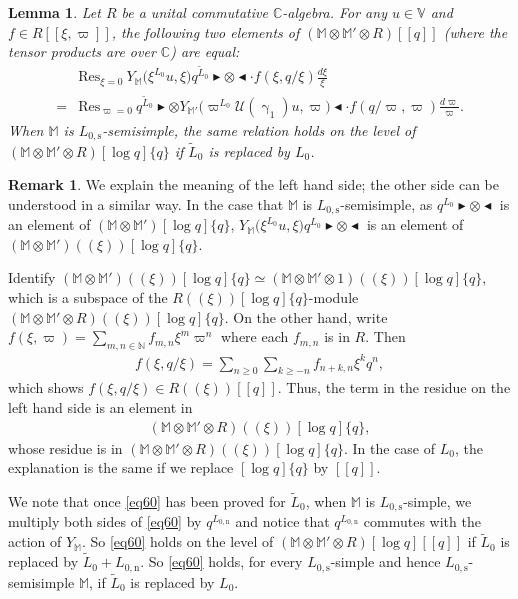 \documentclass[12pt,a4paper,notitlepage]{article}
\theoremstyle{definition}
\newtheorem{rem}[df]{Remark}
\theoremstyle{plain}
\newtheorem{lm}[df]{Lemma}
\newcommand{\mc}{\mathcal}
\newcommand{\wtd}{\widetilde}
\newcommand{\Res}{\mathrm{Res}}
\newcommand{\Vbb}{\mathbb V}
\newcommand{\Mbb}{\mathbb M}
\newcommand{\Cbb}{\mathbb C}
\newcommand{\Nbb}{\mathbb N}
\newcommand{\btl}{\blacktriangleleft}
\newcommand{\btr}{\blacktriangleright}
\newcommand{\Lss}{{L_{0,\mathrm{s}}}}
\newcommand{\Lni}{{L_{0,\mathrm{n}}}}
\numberwithin{equation}{section}
\begin{document}
\begin{lm}\label{lb32}
	Let $R$ be a unital commutative $\Cbb$-algebra.  For any $u\in\Vbb$ and $f\in R[[\xi,\varpi]]$, the following two elements of $(\Mbb\otimes\Mbb'\otimes R)[[q]]$ (where the tensor products are over $\Cbb$) are equal:
	\begin{align}
	&\Res_{\xi=0}~Y_{\Mbb}\big(\xi^{L_0}u,\xi\big)q^{\wtd L_0}\btr\otimes\btl\cdot f(\xi,q/\xi)\frac{d\xi}{\xi}\nonumber\\
	=&\Res_{\varpi=0}~q^{\wtd L_0}\btr\otimes Y_{\Mbb'}\big(\varpi^{L_0}\mc U(\upgamma_1)u,\varpi\big)\btl\cdot f(q/\varpi,\varpi)\frac{d\varpi}{\varpi}.\label{eq60}
	\end{align}
When $\Mbb$ is $\Lss$-semisimple, the same relation holds on the level of $(\Mbb\otimes\Mbb'\otimes R)[\log q]\{q\}$ if $\wtd L_0$ is replaced by $L_0$.
\end{lm}


\begin{rem}\label{lb33}
We  explain the meaning of the left hand side; the other side can be understood in a similar way. In the case that $\Mbb$ is $\Lss$-semisimple, as   $q^{L_0}\btr\otimes\btl$  is an element of $(\Mbb\otimes\Mbb')[\log q]\{q\}$, $Y_{\Mbb}\big(\xi^{L_0}u,\xi\big)q^{L_0}\btr\otimes\btl$ is an element of $(\Mbb\otimes\Mbb')((\xi))[\log q]\{q\}$. 

Identify $(\Mbb\otimes\Mbb')((\xi))[\log q]\{q\}\simeq (\Mbb\otimes\Mbb'\otimes 1)((\xi))[\log q]\{q\}$, which is a subspace of the $R((\xi))[\log q]\{q\}$-module $(\Mbb\otimes\Mbb'\otimes R)((\xi))[\log q]\{q\}$.  On the other hand,  write $f(\xi,\varpi)=\sum_{m,n\in\Nbb}f_{m,n}\xi^m\varpi^n$ where each $f_{m,n}$ is in $R$. Then
	\begin{align*}
	f(\xi,q/\xi)=\sum_{n\geq 0}\sum_{k\geq -n}f_{n+k,n}\xi^k q^n,
	\end{align*}
	which shows $f(\xi,q/\xi)\in R((\xi))[[q]]$. Thus, the term in the residue on the left hand side is an element in
	\begin{align*}
	(\Mbb\otimes\Mbb'\otimes R)((\xi))[\log q]\{q\},
	\end{align*}
	whose residue is in $(\Mbb\otimes\Mbb'\otimes R)((\xi))[\log q]\{q\}$. In the case of $L_0$, the explanation is the same if we replace $[\log q]\{q\}$ by $[[q]]$.
	
We note that once \eqref{eq60} has been proved for $\wtd L_0$, when $\Mbb$ is $\Lss$-simple, we multiply both sides of \eqref{eq60} by $q^\Lni$ and notice that $q^\Lni$ commutes with the action of $Y_\Mbb$. So \eqref{eq60} holds on the level of $(\Mbb\otimes\Mbb'\otimes R)[\log q][[q]]$ if $\wtd L_0$ is replaced by $\wtd L_0+\Lni$. So \eqref{eq60} holds, for every $\Lss$-simple and hence $\Lss$-semisimple $\Mbb$, if $\wtd L_0$ is replaced	by $L_0$.
\end{rem}
\end{document}
